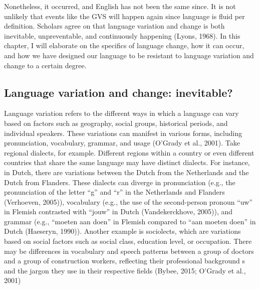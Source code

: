 Nonetheless, it occurred, and English has not been the same since. It is not unlikely that events like the GVS will happen again since language is fluid per definition. Scholars agree on that language variation and change is both inevitable, unpreventable, and continuously happening (Lyons, 1968). In this chapter, I will elaborate on the specifics of language change, how it can occur, and how we have designed our language to be resistant to language variation and change to a certain degree. 


\subsection{Language variation and change: inevitable?}

Language variation refers to the different ways in which a language can vary based on factors such as geography, social groups, historical periods, and individual speakers. These variations can manifest in various forms, including pronunciation, vocabulary, grammar, and usage (O’Grady et al., 2001). Take regional dialects, for example. Different regions within a country or even different countries that share the same language may have distinct dialects. For instance, in Dutch, there are variations between the Dutch from the Netherlands and the Dutch from Flanders. These dialects can diverge in pronunciation (e.g., the pronunciation of the letter “g” and “r” in the Netherlands and Flanders (Verhoeven, 2005)), vocabulary (e.g., the use of the second-person pronoun “uw” in Flemish contrasted with “jouw” in Dutch (Vandekerckhove, 2005)), and grammar (e.g., “moeten aan doen” in Flemish compared to “aan moeten doen” in Dutch (Haeseryn, 1990)). Another example is sociolects, which are variations based on social factors such as social class, education level, or occupation. There may be differences in vocabulary and speech patterns between a group of doctors and a group of construction workers, reflecting their professional background s and the jargon they use in their respective fields (Bybee, 2015; O’Grady et al., 2001) 

